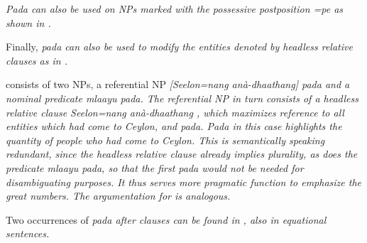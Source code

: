\em Pada \em can also be used on NPs marked with the possessive postposition \em =pe \em as shown in .




Finally, \em pada \em can also be used to modify the entities denoted by headless relative clauses as in .



 consists of two NPs, a referential NP \em [Seelon=nang anà-dhaathang] pada \em and a nominal predicate \em mlaayu pada\em. The referential NP in turn consists of a headless relative clause \em Seelon=nang anà-dhaathang \zero{}\em, which maximizes reference to all entities which had come to Ceylon, and \em pada\em. \em Pada \em in this case highlights the quantity of people who had come to Ceylon. This is semantically speaking redundant, since the headless relative clause already implies plurality, as does the predicate \em mlaayu pada\em, so that the first \em pada \em would not be needed for disambiguating purposes. It thus serves more pragmatic function to emphasize the great numbers. The argumentation for  is analogous.

Two occurrences of \em pada \em after clauses can be found in , also in equational sentences.


